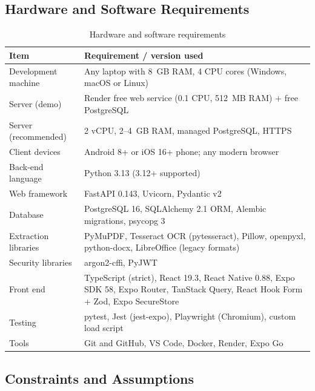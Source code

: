 \subsection{Hardware and Software Requirements}
\begin{table}[H]
\centering
\caption{Hardware and software requirements}
\label{tab:hwsw}
\small
\begin{tabularx}{\textwidth}{@{}p{3.4cm}X@{}}
\toprule
\textbf{Item} & \textbf{Requirement / version used}\\
\midrule
Development machine & Any laptop with 8~GB RAM, 4 CPU cores (Windows, macOS or Linux)\\
Server (demo) & Render free web service (0.1 CPU, 512~MB RAM) + free PostgreSQL\\
Server (recommended) & 2 vCPU, 2--4~GB RAM, managed PostgreSQL, HTTPS\\
Client devices & Android 8+ or iOS 16+ phone; any modern browser\\
Back-end language & Python 3.13 (3.12+ supported)\\
Web framework & FastAPI 0.143, Uvicorn, Pydantic v2\\
Database & PostgreSQL 16, SQLAlchemy 2.1 ORM, Alembic migrations, psycopg 3\\
Extraction libraries & PyMuPDF, Tesseract OCR (pytesseract), Pillow, openpyxl, python-docx, LibreOffice (legacy formats)\\
Security libraries & argon2-cffi, PyJWT\\
Front end & TypeScript (strict), React 19.3, React Native 0.88, Expo SDK 58, Expo Router, TanStack Query, React Hook Form + Zod, Expo SecureStore\\
Testing & pytest, Jest (jest-expo), Playwright (Chromium), custom load script\\
Tools & Git and GitHub, VS Code, Docker, Render, Expo Go\\
\bottomrule
\end{tabularx}
\end{table}

\subsection{Constraints and Assumptions}
